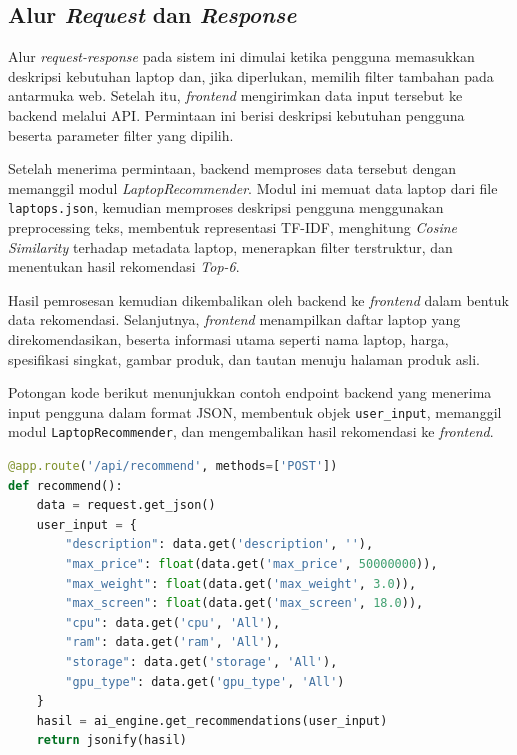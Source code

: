 \subsection{Alur \textit{Request} dan \textit{Response}}
Alur \textit{request-response} pada sistem ini dimulai ketika pengguna memasukkan deskripsi kebutuhan laptop dan, jika diperlukan, memilih filter tambahan pada antarmuka web. Setelah itu, \textit{frontend} mengirimkan data input tersebut ke backend melalui API. Permintaan ini berisi deskripsi kebutuhan pengguna beserta parameter filter yang dipilih.

Setelah menerima permintaan, backend memproses data tersebut dengan memanggil modul \textit{LaptopRecommender}. Modul ini memuat data laptop dari file \texttt{laptops.json}, kemudian memproses deskripsi pengguna menggunakan preprocessing teks, membentuk representasi TF-IDF, menghitung \textit{Cosine Similarity} terhadap metadata laptop, menerapkan filter terstruktur, dan menentukan hasil rekomendasi \textit{Top-6}.

Hasil pemrosesan kemudian dikembalikan oleh backend ke \textit{frontend} dalam bentuk data rekomendasi. Selanjutnya, \textit{frontend} menampilkan daftar laptop yang direkomendasikan, beserta informasi utama seperti nama laptop, harga, spesifikasi singkat, gambar produk, dan tautan menuju halaman produk asli.

Potongan kode berikut menunjukkan contoh endpoint backend yang menerima input pengguna dalam format JSON, membentuk objek \texttt{user\_input}, memanggil modul \texttt{LaptopRecommender}, dan mengembalikan hasil rekomendasi ke \textit{frontend}.

\begin{lstlisting}[basicstyle=\linespread{0.8}\ttfamily\footnotesize, language=Python, breaklines=true, caption={Potongan Kode Endpoint API Rekomendasi}, label=kode:endpoint_api_rekomendasi]
@app.route('/api/recommend', methods=['POST'])
def recommend():
    data = request.get_json()
    user_input = {
        "description": data.get('description', ''),
        "max_price": float(data.get('max_price', 50000000)),
        "max_weight": float(data.get('max_weight', 3.0)),
        "max_screen": float(data.get('max_screen', 18.0)),
        "cpu": data.get('cpu', 'All'),
        "ram": data.get('ram', 'All'),
        "storage": data.get('storage', 'All'),
        "gpu_type": data.get('gpu_type', 'All')
    }
    hasil = ai_engine.get_recommendations(user_input)
    return jsonify(hasil)
\end{lstlisting}

